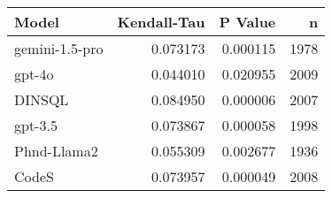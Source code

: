 \begin{tabular}{lrrr}
\toprule
Model & Kendall-Tau & P Value & n \\
\midrule
gemini-1.5-pro & 0.073173 & 0.000115 & 1978 \\
gpt-4o & 0.044010 & 0.020955 & 2009 \\
DINSQL & 0.084950 & 0.000006 & 2007 \\
gpt-3.5 & 0.073867 & 0.000058 & 1998 \\
Phnd-Llama2 & 0.055309 & 0.002677 & 1936 \\
CodeS & 0.073957 & 0.000049 & 2008 \\
\bottomrule
\end{tabular}

